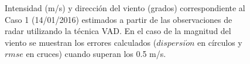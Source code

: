 \documentclass[12pt,spanish,oneside, a4paper]{book}
\title{}
\subtitle{Validación de parametrizaciones de capa límite utilizando datos de radar}
\author{Paola Corrales}
\date{}
\begin{document}
\begin{figure}
\newline{}\caption{Intensidad (m/s) y dirección del viento (grados) correspondiente al Caso 1 (14/01/2016) estimados a partir de las observaciones de radar utilizando la técnica VAD. En el caso de la magnitud del viento se muestran los errores calculados ($dispersi\acute{o}n$ en círculos y $rmse$ en cruces) cuando superan los 0.5 m/s. \label{campo-caso1}}\label{fig:campo-caso1}
\end{figure}
\end{document}
